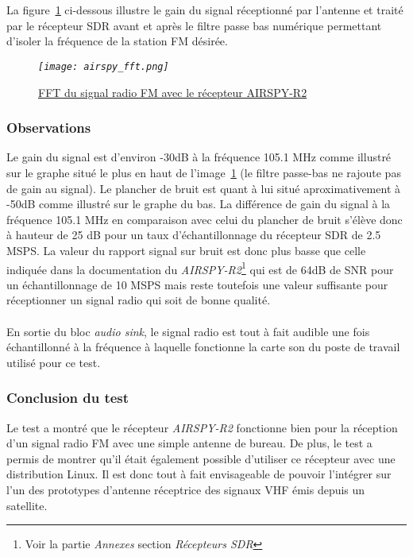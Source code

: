 \documentclass[12pt,fleqn]{book} %
\begin{document}
~\\\\La figure~\underline{\color{blue}\ref{airspy_fft}} ci-dessous illustre le gain du signal réceptionné par l'antenne et traité par le récepteur SDR avant et après le filtre passe bas numérique permettant d'isoler la fréquence de la station FM désirée.
\begin{figure}[H]
	\centering
	\itshape
	\texttt{[image: airspy\_fft.png]}
	\caption{\label{airspy_fft} \underline{FFT du signal radio FM avec le récepteur AIRSPY-R2}}
\end{figure}
\subsubsection{Observations}
\noindent Le gain du signal est d'environ -30dB à la fréquence 105.1 MHz comme illustré sur le graphe situé le plus en haut de l'image~\underline{\color{blue}\ref{airspy_fft}} (le filtre passe-bas ne rajoute pas de gain au signal). Le plancher de bruit est quant à lui situé aproximativement à -50dB comme illustré sur le graphe du bas. La différence de gain du signal à la fréquence 105.1 MHz en comparaison avec celui du plancher de bruit s'élève donc à hauteur de 25 dB pour un taux d'échantillonnage du récepteur SDR de 2.5 MSPS.
La valeur du rapport signal sur bruit est donc plus basse que celle indiquée dans la documentation du \emph{AIRSPY-R2}\footnote{Voir la partie \emph{Annexes} section \emph{Récepteurs SDR}} qui est de 64dB de SNR pour un échantillonnage de 10 MSPS mais reste toutefois une valeur suffisante pour réceptionner un signal radio qui soit de bonne qualité.
~\\\\En sortie du bloc \emph{audio sink}, le signal radio est tout à fait audible une fois échantillonné à la fréquence à laquelle fonctionne la carte son du poste de travail utilisé pour ce test.
\subsubsection{Conclusion du test}
\noindent Le test a montré que le récepteur \emph{AIRSPY-R2} fonctionne bien pour la réception d'un signal radio FM avec une simple antenne de bureau. De plus, le test a permis de montrer qu'il était également possible d'utiliser ce récepteur avec une distribution Linux.
Il est donc tout à fait envisageable de pouvoir l'intégrer sur l'un des prototypes d'antenne réceptrice des signaux VHF émis depuis un satellite.
\end{document}
